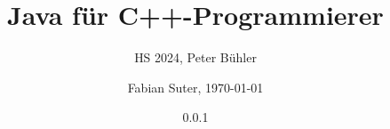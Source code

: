 \documentclass[fontsize=8pt, a4paper, fleqn, landscape, DIV=calc]{scrartcl}
\title{\vspace{-1cm}Java für C++-Programmierer}
\subtitle{HS 2024, Peter Bühler}
\author{Fabian Suter, \today}
\date{{\small 0.0.1}}
\begin{document}
	\begin{multicols*}{3}
        \raggedcolumns
        \begin{minipage}{0.75\columnwidth}
		      \maketitle
        \end{minipage}
        \begin{minipage}{0.2\columnwidth}
            \begin{center}
                \quad
                \qquad    
            \end{center}
        \end{minipage}
        
        \thispagestyle{fancy}%

        
        
        
        
        

	\end{multicols*}
\end{document}
